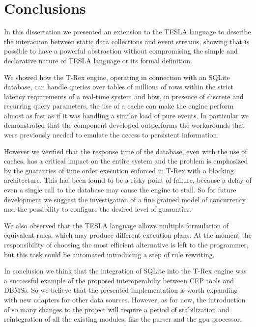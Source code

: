 \chapter*{Conclusions}


In this dissertation we presented an extension to the TESLA language to describe the interaction between static data collections and event streams, showing that is possible to have a powerful abstraction without compromising the simple and declarative nature of TESLA language or its formal definition.

We showed how the T-Rex engine, operating in connection with an SQLite database, can handle queries over tables of millions of rows within the strict latency requirements of a real-time system and how, in presence of discrete and recurring query parameters, the use of a cache can make the engine perform almost as fast as if it was handling a similar load of pure events. In particular we demonstrated that the component developed outperforms the workarounds that were previously needed to emulate the access to persistent information.

However we verified that the response time of the database, even with the use of caches, has a critical impact on the entire system and the problem is emphasized by the guaranties of time order execution enforced in T-Rex with a blocking architecture. This has been found to be a risky point of failure, because a delay of even a single call to the database may cause the engine to stall. So for future development we suggest the investigation of a fine grained model of concurrency and the possibility to configure the desired level of guaranties.

We also observed that the TESLA language allows multiple formulation of equivalent rules, which may produce different execution plans. At the moment the responsibility of choosing the most efficient alternative is left to the programmer, but this task could be automated introducing a step of rule rewriting.

In conclusion we think that the integration of SQLite into the T-Rex engine was a successful example of the proposed interoperabiliy between CEP tools and DBMSs. So we believe that the presented implementation is worth expanding with new adapters for other data sources. However, as for now, the introduction of so many changes to the project will require a period of stabilization and reintegration of all the existing modules, like the parser and the gpu processor.